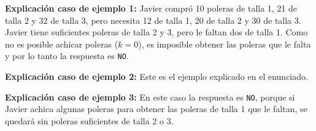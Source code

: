 \documentclass{oci}
\begin{document}
\begin{sampleDescription}
\begin{center}
    \begin{minipage}{0.94\textwidth}
    \textbf{Explicación caso de ejemplo 1:} Javier compró 10 poleras de talla 1, 21 de talla 2 y 32 de talla 3,
    pero necesita 12 de talla 1, 20 de talla 2 y 30 de talla 3.
    Javier tiene suficientes poleras de talla 2 y 3, pero le faltan dos de talla 1.
    Como no es posible achicar poleras ($k=0$), es imposible obtener las poleras que le falta y por
    lo tanto la respuesta es \texttt{NO}.
    \end{minipage}
\end{center}

\begin{center}
    \begin{minipage}{0.94\textwidth}
    \textbf{Explicación caso de ejemplo 2:} Este es el ejemplo explicado en el enunciado.
    \end{minipage}
\end{center}

\begin{center}
    \begin{minipage}{0.94\textwidth}
    \textbf{Explicación caso de ejemplo 3:} En este caso la respuesta es \texttt{NO}, porque si Javier
    achica algunas poleras para obtener las poleras de talla 1 que le faltan, se quedará sin poleras
    suficientes de talla 2 o 3.
    \end{minipage}
\end{center}
\end{sampleDescription}
\end{document}
